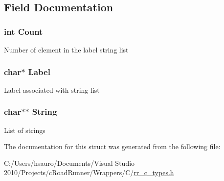\subsection{\-Field \-Documentation}
\hypertarget{struct_r_r_label_string_list_aad462966ed963f892117056de1eba502}{
\subsubsection[{\-Count}]{\setlength{\rightskip}{0pt plus 5cm}int {\bf \-Count}}}
\label{struct_r_r_label_string_list_aad462966ed963f892117056de1eba502}
\-Number of element in the label string list \hypertarget{struct_r_r_label_string_list_af91fd2b26f73a15052d23933bee0ed5a}{
\subsubsection[{\-Label}]{\setlength{\rightskip}{0pt plus 5cm}char$\ast$ {\bf \-Label}}}
\label{struct_r_r_label_string_list_af91fd2b26f73a15052d23933bee0ed5a}
\-Label associated with string list \hypertarget{struct_r_r_label_string_list_acdbc34377baf3e52d9044aada0f2f511}{
\subsubsection[{\-String}]{\setlength{\rightskip}{0pt plus 5cm}char$\ast$$\ast$ {\bf \-String}}}
\label{struct_r_r_label_string_list_acdbc34377baf3e52d9044aada0f2f511}
\-List of strings 

\-The documentation for this struct was generated from the following file\-:\begin{DoxyCompactItemize}
\item 
\-C\-:/\-Users/hsauro/\-Documents/\-Visual Studio 2010/\-Projects/c\-Road\-Runner/\-Wrappers/\-C/\hyperlink{rr__c__types_8h}{rr\-\_\-c\-\_\-types.\-h}\end{DoxyCompactItemize}
